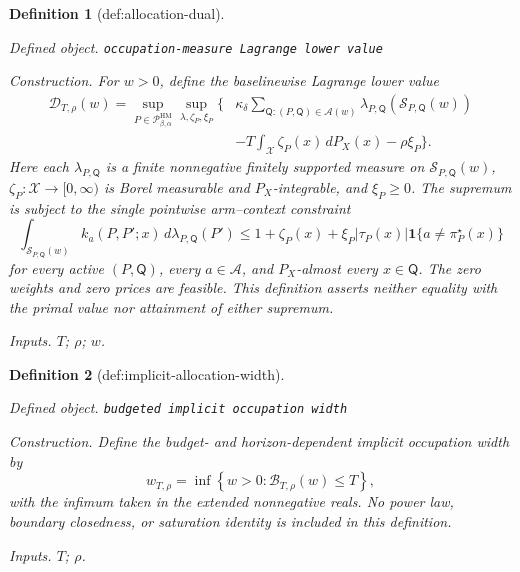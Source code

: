 \documentclass{article}
\newtheorem{definition}{Definition}
\begin{document}
\begin{definition}[def:allocation-dual]\label{def:allocation-dual}
\par\smallskip\noindent\emph{Defined object.} \texttt{occupation-\allowbreak{}measure Lagrange lower value}
\par\smallskip\noindent\emph{Construction.} For \(w>0\), define the baselinewise Lagrange lower value
\[
\begin{split}
\mathcal D_{T,\rho}(w)
=\sup_{P\in\mathcal P_{\beta,\alpha}^{\mathrm{HM}}}
\sup_{\lambda,\zeta_P,\xi_P}
\Bigg\{&\kappa_\delta
\sum_{\mathsf Q:(P,\mathsf Q)\in\mathscr A(w)}
\lambda_{P,\mathsf Q}(\mathcal S_{P,\mathsf Q}(w))\\
&-T\int_{\mathcal X}\zeta_P(x)\,dP_X(x)-\rho\xi_P\Bigg\}.
\end{split}
\]
Here each \(\lambda_{P,\mathsf Q}\) is a finite nonnegative finitely supported measure on \(\mathcal S_{P,\mathsf Q}(w)\), \(\zeta_P:\mathcal X\to[0,\infty)\) is Borel measurable and \(P_X\)-integrable, and \(\xi_P\ge0\).  The supremum is subject to the single pointwise arm--context constraint
\[
\int_{\mathcal S_{P,\mathsf Q}(w)}
k_a(P,P';x)\,d\lambda_{P,\mathsf Q}(P')
\le
1+\zeta_P(x)+\xi_P|\tau_P(x)|\mathbf 1\{a\ne\pi_P^\star(x)\}
\]
for every active \((P,\mathsf Q)\), every \(a\in\mathcal A\), and \(P_X\)-almost every \(x\in\mathsf Q\).  The zero weights and zero prices are feasible.  This definition asserts neither equality with the primal value nor attainment of either supremum.
\par\smallskip\noindent\emph{Inputs.} \(T\); \(\rho\); \(w\).
\end{definition}

\begin{definition}[def:implicit-allocation-width]\label{def:implicit-allocation-width}
\par\smallskip\noindent\emph{Defined object.} \texttt{budgeted implicit occupation width}
\par\smallskip\noindent\emph{Construction.} Define the budget- and horizon-dependent implicit occupation width by
\[
w_{T,\rho}=\inf\left\{w>0:\mathcal B_{T,\rho}(w)\le T\right\},
\]
with the infimum taken in the extended nonnegative reals.  No power law, boundary closedness, or saturation identity is included in this definition.
\par\smallskip\noindent\emph{Inputs.} \(T\); \(\rho\).
\end{definition}
\end{document}
